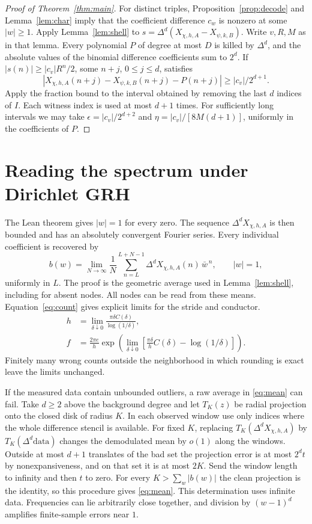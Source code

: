\documentclass[11pt]{article}
\newcommand{\model}{X_{\chi,h,A}}
\begin{document}
\begin{proof}[Proof of Theorem~\ref{thm:main}]
For distinct triples, Proposition~\ref{prop:decode} and Lemma~\ref{lem:char} imply that the coefficient difference $c_w$ is nonzero at some $|w|\ge1$. Apply Lemma~\ref{lem:shell} to $s=\Delta^d(X_{\chi,h,A}-X_{\psi,k,B})$. Write $v,R,M$ as in that lemma. Every polynomial $P$ of degree at most $D$ is killed by $\Delta^d$, and the absolute values of the binomial difference coefficients sum to $2^d$. If $|s(n)|\ge |c_v|R^n/2$, some $n+j$, $0\le j\le d$, satisfies
\[
 |X_{\chi,h,A}(n+j)-X_{\psi,k,B}(n+j)-P(n+j)|
 \ge |c_v|/2^{d+1}.
\]
Apply the fraction bound to the interval obtained by removing the last $d$ indices of $I$. Each witness index is used at most $d+1$ times. For sufficiently long intervals we may take $\epsilon=|c_v|/2^{d+2}$ and $\eta=|c_v|/[8M(d+1)]$, uniformly in the coefficients of $P$.
\end{proof}

\section{Reading the spectrum under Dirichlet GRH}\label{sec:fourier}
The Lean theorem gives $|w|=1$ for every zero. The sequence $\Delta^d\model$ is then bounded and has an absolutely convergent Fourier series. Every individual coefficient is recovered by
\begin{equation}
 b(w)=\lim_{N\to\infty}\frac1N\sum_{n=L}^{L+N-1}
          \Delta^d\model(n)\,\bar w^{\,n},\qquad |w|=1, \label{eq:mean}
\end{equation}
uniformly in $L$. The proof is the geometric average used in Lemma~\ref{lem:shell}, including for absent nodes. All nodes can be read from these means. Equation~\eqref{eq:count} gives explicit limits for the stride and conductor.
\begin{align*}
 h&=\lim_{\delta\downarrow0}\frac{\pi\delta C(\delta)}{\log(1/\delta)},\\
 f&=\frac{2\pi e}{h}\exp\left(\lim_{\delta\downarrow0}
     \left[\frac{\pi\delta}{h}C(\delta)-\log(1/\delta)\right]\right).
\end{align*}
Finitely many wrong counts outside the neighborhood in which rounding is exact leave the limits unchanged.

If the measured data contain unbounded outliers, a raw average in \eqref{eq:mean} can fail. Take $d\ge2$ above the background degree and let $T_K(z)$ be radial projection onto the closed disk of radius $K$. In each observed window use only indices where the whole difference stencil is available. For fixed $K$, replacing $T_K(\Delta^d\model)$ by $T_K(\Delta^d\text{data})$ changes the demodulated mean by $o(1)$ along the windows. Outside at most $d+1$ translates of the bad set the projection error is at most $2^dt$ by nonexpansiveness, and on that set it is at most $2K$. Send the window length to infinity and then $t$ to zero. For every $K>\sum_w|b(w)|$ the clean projection is the identity, so this procedure gives \eqref{eq:mean}. This determination uses infinite data. Frequencies can lie arbitrarily close together, and division by $(w-1)^d$ amplifies finite-sample errors near $1$.
\end{document}
